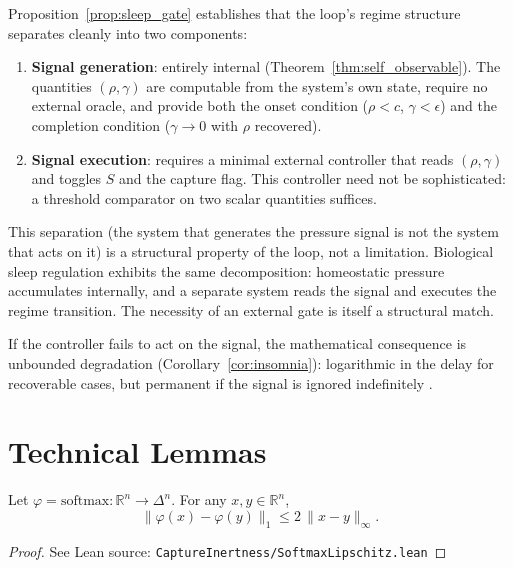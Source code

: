 \begin{remark}
\label{rem:controller}
\leanok
Proposition~\ref{prop:sleep_gate} establishes that the loop's regime structure separates cleanly into two components:
\begin{enumerate}
\item \textbf{Signal generation}: entirely internal (Theorem~\ref{thm:self_observable}).  The quantities $(\rho, \gamma)$ are computable from the system's own state, require no external oracle, and provide both the onset condition ($\rho < c$, $\gamma < \epsilon$) and the completion condition ($\gamma \to 0$ with $\rho$ recovered).
\item \textbf{Signal execution}: requires a minimal external controller that reads $(\rho, \gamma)$ and toggles $S$ and the capture flag.  This controller need not be sophisticated: a threshold comparator on two scalar quantities suffices.
\end{enumerate}
This separation (the system that generates the pressure signal is not the system that acts on it) is a structural property of the loop, not a limitation.  Biological sleep regulation exhibits the same decomposition: homeostatic pressure accumulates internally, and a separate system reads the signal and executes the regime transition.  The necessity of an external gate is itself a structural match.

If the controller fails to act on the signal, the mathematical consequence is unbounded degradation (Corollary~\ref{cor:insomnia}): logarithmic in the delay for recoverable cases, but permanent if the signal is ignored indefinitely \citep{vandongen2003,dawson1997}.
\end{remark}

\chapter{Technical Lemmas}\label{ch:technical}

\begin{lemma}
\label{lem:softmax_lipschitz}
\leanok
Let $\varphi = \mathrm{softmax}\colon \mathbb{R}^n \to \Delta^n$.  For any $x, y \in \mathbb{R}^n$,
\[
\|\varphi(x) - \varphi(y)\|_1 \leq 2\,\|x - y\|_\infty.
\]
\end{lemma}

\begin{proof}
\leanok
See Lean source: \texttt{CaptureInertness/SoftmaxLipschitz.lean}
\end{proof}

